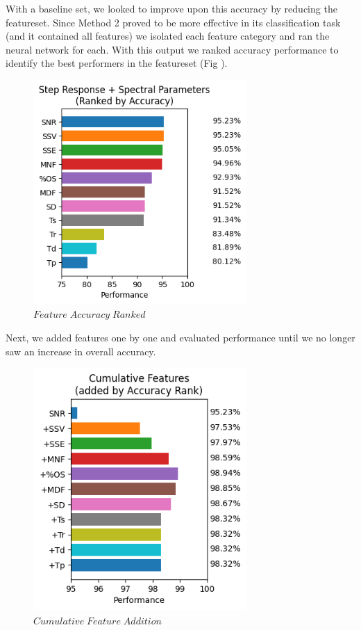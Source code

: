 \documentclass[conference]{IEEEtran}
\begin{document}
With a baseline set, we looked to improve upon this accuracy by reducing the featureset. Since Method 2 proved to be more effective in its classification task (and it contained all features) we isolated each feature category and ran the neural network for each. With this output we ranked accuracy performance to identify the best performers in the featureset (Fig ).

\begin{figure}[htb]
\centering
\includegraphics[width=3.2in]{figures/90_m2rank.png}
\caption{$Feature\;Accuracy\;Ranked$}
\label{fig:Rank}
\end{figure}

Next, we added features one by one and evaluated performance until we no longer saw an increase in overall accuracy.

\begin{figure}[htb]
\centering
\includegraphics[width=3.2in]{figures/91_m2cumsum.png}
\caption{$Cumulative\;Feature\;Addition$}
\label{fig:CumRank}
\end{figure}
\end{document}

